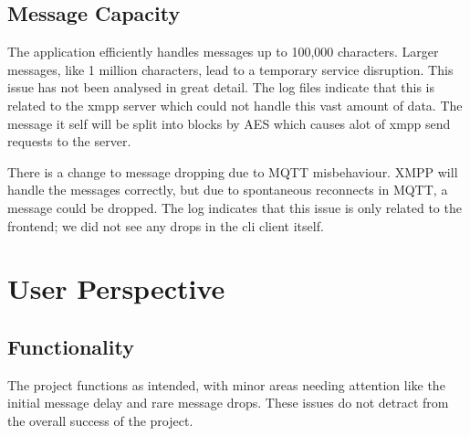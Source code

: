 \subsection{Message Capacity} The application efficiently handles messages up to 100,000 characters. Larger messages, like 1 million characters, lead to a temporary service disruption. This issue has not been analysed in great detail. The log files indicate that this is related to the xmpp server which could not handle this vast amount of data. The message it self will be split into blocks by AES which causes alot of xmpp send requests to the server.

There is a change to message dropping due to MQTT misbehaviour. XMPP will handle the messages correctly, but due to spontaneous reconnects in MQTT, a message could be dropped. The log indicates that this issue is only related to the frontend; we did not see any drops in the cli client itself.

\section{User Perspective}

\subsection{Functionality}
The project functions as intended, with minor areas needing attention like the initial message delay and rare message drops. These issues do not detract from the overall success of the project.
